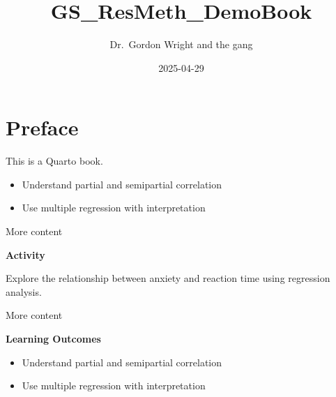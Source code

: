 \documentclass[
  letterpaper,
  DIV=11,
  numbers=noendperiod]{scrreprt}
\title{GS\_ResMeth\_DemoBook}
\author{Dr.~Gordon Wright and the gang}
\date{2025-04-29}
\providecommand{\tightlist}{%
  \setlength{\itemsep}{0pt}\setlength{\parskip}{0pt}}\usepackage{longtable,booktabs,array}
\renewcommand*\contentsname{Table of contents}
\newcommand\contentsname{Table of contents}
\begin{document}
\maketitle

\renewcommand*\contentsname{Table of contents}
{
\hypersetup{linkcolor=}
\setcounter{tocdepth}{2}
\tableofcontents
}


\chapter*{Preface}\label{preface}


This is a Quarto book.





\begin{gslearningoutcome}

\begin{itemize}
\tightlist
\item
  Understand partial and semipartial correlation
\item
  Use multiple regression with interpretation
\end{itemize}

\end{gslearningoutcome}

More content

\begin{gsactivity}

\textbf{Activity}

Explore the relationship between anxiety and reaction time using
regression analysis.

\end{gsactivity}

More content

\begin{gslearningoutcome}

\textbf{Learning Outcomes}

\begin{itemize}
\tightlist
\item
  Understand partial and semipartial correlation\\
\item
  Use multiple regression with interpretation
\end{itemize}

\end{gslearningoutcome}
\end{document}

